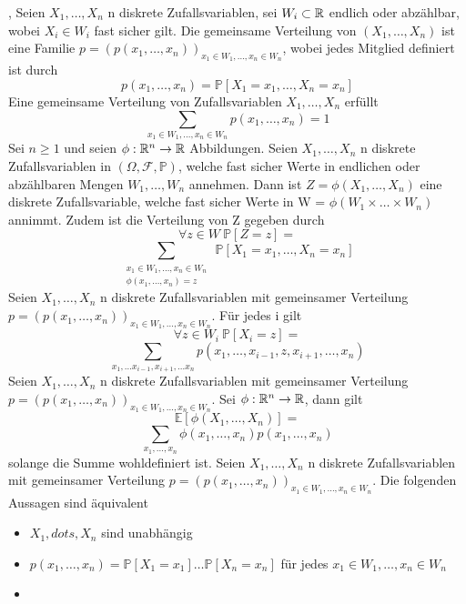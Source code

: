 \sep
\Def[5.1] \newline
Seien \(X_1, \dots , X_n\) n diskrete Zufallsvariablen, sei \( W_i \subset \mathbb{R} \) endlich oder abzählbar, wobei \(X_i \in W_i\) fast sicher gilt. Die gemeinsame Verteilung von \((X_1, \dots , X_n)\) ist eine Familie \( p = (p(x_1, \dots , x_n))_{x_1 \in W_1, \dots ,x_n \in W_n}\), wobei jedes Mitglied definiert ist durch \[ p(x_1, \dots , x_n) = \mathbb{P}[X_1 = x_1 , \dots , X_n = x_n]\]
\Satz[5.2] \newline
Eine gemeinsame Verteilung von Zufallsvariablen \( X_1, \dots , X_n\) erfüllt \[ \sum_{x_1 \in W_1, \dots , x_n \in W_n } p(x_1, \dots, x_n ) = 1\]
\Satz[5.3] \newline
Sei \( n \geq 1 \) und seien \( \phi : \mathbb{R}^n \rightarrow \mathbb{R} \) Abbildungen. Seien \(X_1, \dots, X_n\) n diskrete Zufallsvariablen in \( (\Omega, \mathcal{F}, \mathbb{P})\), welche fast sicher Werte in endlichen oder abzählbaren Mengen \(W_1, \dots , W_n\) annehmen. Dann ist \( Z = \phi(X_1, \dots , X_n)\) eine diskrete Zufallsvariable, welche fast sicher Werte in W = \(\phi(W_1 \times \dots \times W_n)\) annimmt. Zudem ist die Verteilung von Z gegeben durch \[ \forall z \in W \ \mathbb{P}[Z=z]= \] \[\sum_{\substack{x_1 \in W_1, \dots , x_n \in W_n \\ \phi(x_1, \dots , x_n) = z}} \ \mathbb{P}[X_1 = x_1 , \dots , X_n = x_n]\]
\Satz[5.4] \newline 
Seien \(X_1, \dots , X_n\) n diskrete Zufallsvariablen mit gemeinsamer Verteilung \( p = (p(x_1, \dots , x_n ))_{x_1 \in W_1, \dots , x_n \in W_n}\). Für jedes i gilt \[ \forall z \in W_i \ \mathbb{P}[X_i = z] =\] \[ \sum_{x_1, \dots x_{i-1}, x_{i+1}, \dots x_n} p(x_1, \dots , x_{i-1}, z , x_{i+1}, \dots , x_n)\]
\Satz[5.5] \newline
Seien \( X_1 , \dots , X_n \) n diskrete Zufallsvariablen mit gemeinsamer Verteilung \(p = (p(x_1, \dots , x_n))_{x_1 \in W_1, \dots , x_n \in W_n}\). Sei \(\phi: \mathbb{R}^n \rightarrow \mathbb{R} \), dann gilt \[ \mathbb{E}[\phi(X_1, \dots, X_n)] = \] \[\sum_{x_1, \dots , x_n } \phi(x_1, \dots , x_n)p(x_1, \dots , x_n)\] solange die Summe wohldefiniert ist.
\Satz[5.6] \newline
Seien \(X_1, \dots , X_n\) n diskrete Zufallsvariablen mit gemeinsamer Verteilung \(p = (p(x_1, \dots , x_n))_{x_1 \in W_1 , \dots , x_n \in W_n}\). Die folgenden Aussagen sind äquivalent
\begin{itemize}
    \item \(X_1, dots , X_n\) sind unabhängig
    \item \(p(x_1, \dots , x_n ) = \mathbb{P}[X_1 = x_1 ] \dots \mathbb{P}[X_n = x_n ]\) für jedes \(x_1 \in W_1 , \dots , x_n \in W_n\)
    \item 
\end{itemize}
